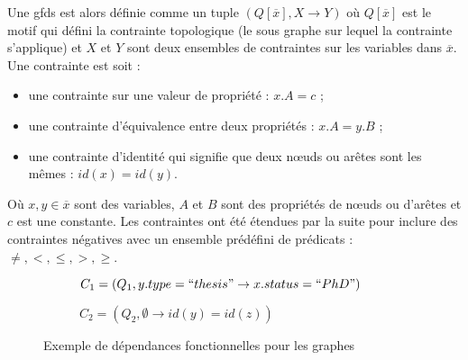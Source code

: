 Une \glspl{gfd} est alors définie comme un tuple $(Q[\overline{x}], X \to Y)$ où $Q[\overline{x}]$ est le motif qui défini la contrainte topologique (le sous graphe sur lequel la contrainte s'applique) et $X$ et $Y$ sont deux ensembles de contraintes sur les variables dans $\overline{x}$.
Une contrainte est soit :
\begin{itemize}
    \item une contrainte sur une valeur de propriété : $x.A = c$ ;
    \item une contrainte d'équivalence entre deux propriétés : $x.A = y.B$ ;
    \item une contrainte d'identité qui signifie que deux nœuds ou arêtes sont les mêmes : $id(x) = id(y)$.
\end{itemize}
Où $x, y \in \overline{x}$ sont des variables, $A$ et $B$ sont des propriétés de nœuds ou d'arêtes et $c$ est une constante.
Les contraintes ont été étendues par la suite pour inclure des contraintes négatives avec un ensemble prédéfini de prédicats : $\neq, <, \le, >, \ge$.

\begin{figure}[ht]
    \centering
    \begin{subfigure}[b]{.53\textwidth}
        \centering
        \caption*{$C_1 = (Q_1, y.type = ``thesis" \to x.status = ``PhD")$}
        \label{fig:gfd:q1}
    \end{subfigure}
    \begin{subfigure}[b]{.37\textwidth}
        \centering
        \caption*{$C_2 = (Q_2, \emptyset \to id(y) = id(z))$}
        \label{fig:gfd:q2}
    \end{subfigure}
    \caption{Exemple de dépendances fonctionnelles pour les graphes}
    \label{fig:gfd}
\end{figure}

